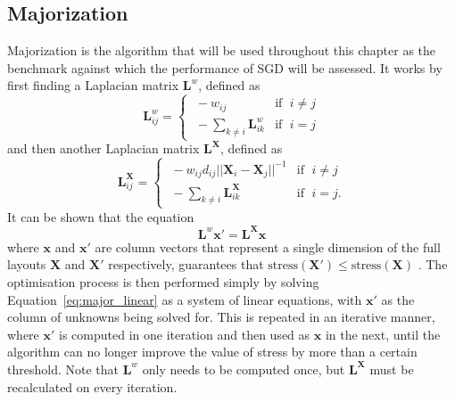 \subsection{Majorization}
\label{sec:majorization}
Majorization is the algorithm that will be used throughout this chapter as the benchmark against which the performance of SGD will be assessed.
It works by first finding a Laplacian matrix $\mathbf{L}^w$, defined as
\begin{equation}
  \mathbf{L}_{ij}^w =
  \begin{cases}
    \;-w_{ij} & \text{if }\;i\neq j\\
    \;-\sum_{k\neq i}\mathbf{L}_{ik}^w & \text{if }\;i=j
  \end{cases}
  \label{eq:major_Lw}
\end{equation}
and then another Laplacian matrix $\mathbf{L^X}$, defined as
\begin{equation}
  \mathbf{L}_{ij}^\mathbf{X} =
  \begin{cases}
    \;-w_{ij}d_{ij}||\mathbf{X}_i-\mathbf{X}_j||^{-1} & \text{if }\;i\neq j\\
    \;-\sum_{k\neq i}\mathbf{L}_{ik}^\mathbf{X} & \text{if }\;i=j.
  \end{cases}
  \label{eq:major_LX}
\end{equation}
It can be shown that the equation
\begin{equation}
  \mathbf{L}^w\mathbf{x}' = \mathbf{L^Xx}
  \label{eq:major_linear}
\end{equation}
where $\mathbf{x}$ and $\mathbf{x}'$ are column vectors that represent a single dimension of the full layouts $\mathbf{X}$ and $\mathbf{X}'$ respectively, guarantees that $\text{stress}(\mathbf{X}') \leq \text{stress}(\mathbf{X})$ \cite{Gansner2004}.
The optimisation process is then performed simply by solving Equation~\eqref{eq:major_linear} as a system of linear equations, with $\mathbf{x}'$ as the column of unknowns being solved for. This is repeated in an iterative manner, where $\mathbf{x}'$ is computed in one iteration and then used as $\mathbf{x}$ in the next, until the algorithm can no longer improve the value of stress by more than a certain threshold. Note that $\mathbf{L}^w$ only needs to be computed once, but $\mathbf{L}^\mathbf{X}$ must be recalculated on every iteration.

